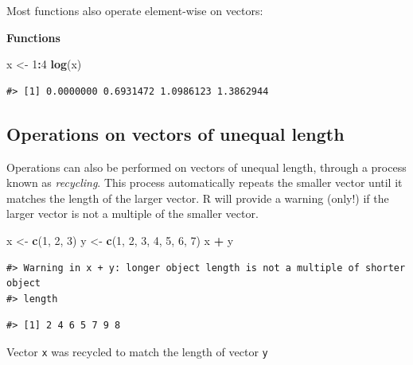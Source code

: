 \documentclass[
]{book}
\newenvironment{Shaded}{\begin{snugshade}}{\end{snugshade}}
\newcommand{\DecValTok}[1]{\textcolor[rgb]{0.00,0.00,0.81}{#1}}
\newcommand{\FunctionTok}[1]{\textcolor[rgb]{0.13,0.29,0.53}{\textbf{#1}}}
\newcommand{\NormalTok}[1]{#1}
\newcommand{\OtherTok}[1]{\textcolor[rgb]{0.56,0.35,0.01}{#1}}
\newcommand{\SpecialCharTok}[1]{\textcolor[rgb]{0.81,0.36,0.00}{\textbf{#1}}}
\begin{document}
Most functions also operate element-wise on vectors:

\textbf{Functions}

\begin{Shaded}
\begin{Highlighting}[]
\NormalTok{x }\OtherTok{\textless{}{-}} \DecValTok{1}\SpecialCharTok{:}\DecValTok{4}
\FunctionTok{log}\NormalTok{(x)}
\end{Highlighting}
\end{Shaded}

\begin{verbatim}
#> [1] 0.0000000 0.6931472 1.0986123 1.3862944
\end{verbatim}

\subsection{Operations on vectors of unequal length}\label{operations-on-vectors-of-unequal-length}

Operations can also be performed on vectors of unequal length, through
a process known as \emph{recycling}. This process automatically repeats the smaller vector
until it matches the length of the larger vector. R will provide a warning
(only!) if the larger vector is not a multiple of the smaller vector.

\begin{Shaded}
\begin{Highlighting}[]
\NormalTok{x }\OtherTok{\textless{}{-}} \FunctionTok{c}\NormalTok{(}\DecValTok{1}\NormalTok{, }\DecValTok{2}\NormalTok{, }\DecValTok{3}\NormalTok{)}
\NormalTok{y }\OtherTok{\textless{}{-}} \FunctionTok{c}\NormalTok{(}\DecValTok{1}\NormalTok{, }\DecValTok{2}\NormalTok{, }\DecValTok{3}\NormalTok{, }\DecValTok{4}\NormalTok{, }\DecValTok{5}\NormalTok{, }\DecValTok{6}\NormalTok{, }\DecValTok{7}\NormalTok{)}
\NormalTok{x }\SpecialCharTok{+}\NormalTok{ y}
\end{Highlighting}
\end{Shaded}

\begin{verbatim}
#> Warning in x + y: longer object length is not a multiple of shorter object
#> length
\end{verbatim}

\begin{verbatim}
#> [1] 2 4 6 5 7 9 8
\end{verbatim}

Vector \texttt{x} was recycled to match the length of vector \texttt{y}
\end{document}
